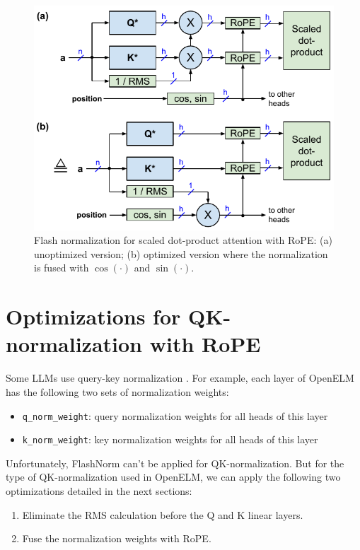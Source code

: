 \documentclass{article}
\def\cosi{\cos{(\cdot)}}              %
\def\sini{\sin{(\cdot)}}              %
\begin{document}
\begin{figure}[h!] \centering
  \includegraphics[scale=0.9]{../doc/fig/flashNorm_fig5.pdf}
  \caption{Flash normalization for scaled dot-product attention with RoPE: (a) unoptimized version; (b) optimized version where the normalization is fused with $\cosi$ and $\sini$.}
\label{fig5} \end{figure}

\section{Optimizations for QK-normalization with RoPE}
Some LLMs use query-key normalization \citep{QKnorm}. For example, each layer of OpenELM \citep{openelm} has the following two sets of normalization weights:
\begin{itemize}[topsep=-1pt, itemsep=-1pt]
  \item \verb+q_norm_weight+: query normalization weights for all heads of this layer
  \item \verb+k_norm_weight+: key normalization weights for all heads of this layer
\end{itemize}
Unfortunately, FlashNorm can't be applied for QK-normalization. But for the type of QK-normalization used in OpenELM, we can apply the following two optimizations detailed in the next sections:
\begin{enumerate}[topsep=-1pt, itemsep=-1pt]
  \item Eliminate the RMS calculation before the Q and K linear layers.
  \item Fuse the normalization weights with RoPE.
\end{enumerate}
\end{document}
